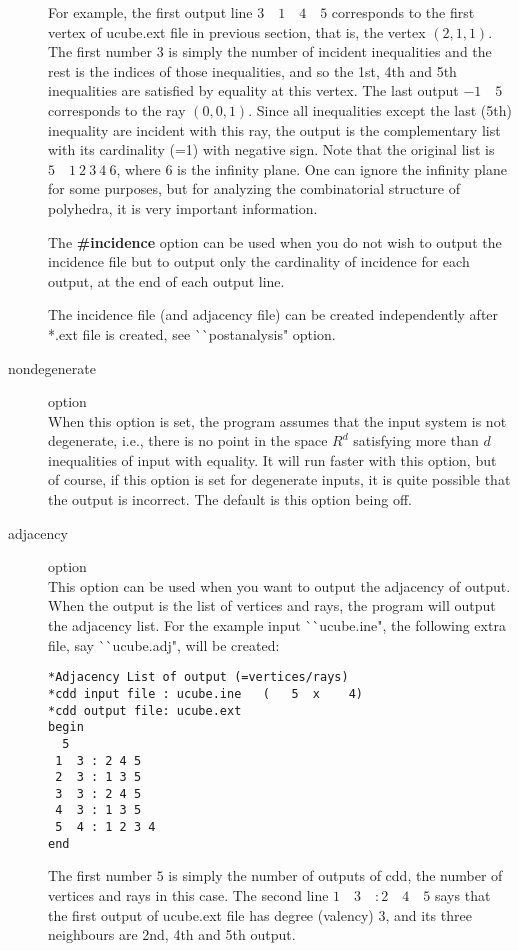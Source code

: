 \begin{description}
For example, the first output line $3 \quad 1 \quad 4 \quad 5$ 
corresponds to the
first vertex of ucube.ext file in previous section, that is, 
the vertex $(2, 1, 1)$.  The first number $3$ is simply the number
of incident inequalities and the rest is the indices of
those inequalities, and so the 1st, 4th and 5th inequalities are
satisfied by equality at this vertex.   The last output
$-1 \quad 5$ corresponds to the ray  $(0,0,1)$.  Since all inequalities
except the last (5th) inequality are incident with this ray,
the output is the complementary list with its cardinality (=1) with negative
sign.  Note that the original list is $5 \quad 1 \: 2 \: 3 \: 4 \: 6$, where
$6$ is the infinity plane.  One can ignore the infinity
plane for some purposes,  but for analyzing the combinatorial 
structure of polyhedra, it is
very important information.

The {\bf \#incidence} option can be used when you do not wish
to output the incidence file but to output only the cardinality of incidence
for each output, at the end of each output line.

The incidence file (and adjacency file) can be created independently
after *.ext file is created, see ^^ ^^ postanalysis" option. 
 
\item[nondegenerate] option\\
When this option is set, the program assumes that the input system
is not degenerate, i.e., there is no point in the space $R^d$ satisfying
more than $d$ inequalities of input with equality.
It will run faster with this option, but of course, 
if this option is set for degenerate inputs, it is 
quite possible that the output is incorrect.  
The default is this option being off.

\item[adjacency] option\\
This option can be used when you want to output the adjacency of output.
When the output is the list of vertices and rays, the program will
output the adjacency list.  For the example input ^^ ^^ ucube.ine",
the following extra file, say ^^ ^^ ucube.adj", will be created:
\begin{verbatim}
*Adjacency List of output (=vertices/rays)
*cdd input file : ucube.ine   (   5  x    4)
*cdd output file: ucube.ext
begin
  5
 1  3 : 2 4 5
 2  3 : 1 3 5
 3  3 : 2 4 5
 4  3 : 1 3 5
 5  4 : 1 2 3 4
end
\end{verbatim}
The first number $5$ is simply the number of outputs of cdd, the
number of vertices and rays in this case.
The second line $ 1 \quad  3 \quad : 2 \quad  4 \quad  5$ says 
that the first output of
ucube.ext file has degree (valency) $3$, and its three neighbours are
2nd, 4th and 5th output.


\end{description}
